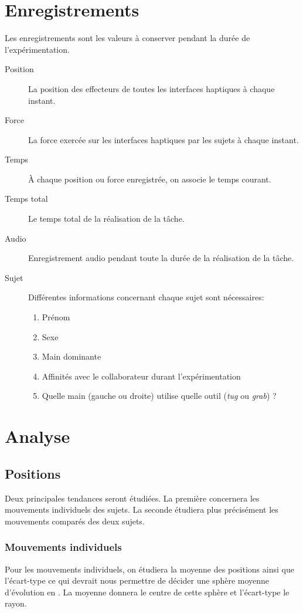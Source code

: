 \documentclass[a4paper,fleqn]{report}
\begin{document}
		\section{Enregistrements}
			Les enregistrements sont les valeurs à conserver pendant la durée de l'expérimentation.
			\begin{description}
				\item[Position] La position des effecteurs de toutes les interfaces haptiques à chaque instant.
				\item[Force] La force exercée sur les interfaces haptiques par les sujets à chaque instant.
				\item[Temps] À chaque position ou force enregistrée, on associe le temps courant.
				\item[Temps total] Le temps total de la réalisation de la tâche.
				\item[Audio] Enregistrement audio pendant toute la durée de la réalisation de la tâche.
				\item[Sujet] Différentes informations concernant chaque sujet sont nécessaires:
				\begin{enumerate}
					\item Prénom 
					\item Sexe
					\item Main dominante
					\item Affinités avec le collaborateur durant l'expérimentation
					\item Quelle main (gauche ou droite) utilise quelle outil (\emph{tug} ou \emph{grab}) ?
				\end{enumerate}
			\end{description}

		\section{Analyse}
			\subsection{Positions}
				Deux principales tendances seront étudiées.
				La première concernera les mouvements individuels des sujets.
				La seconde étudiera plus précisément les mouvements comparés des deux sujets.
				\subsubsection{Mouvements individuels}
					Pour les mouvements individuels, on étudiera la moyenne des positions ainsi que l'écart-type ce qui devrait nous permettre de décider une sphère moyenne d'évolution en .
					La moyenne donnera le centre de cette sphère et l'écart-type le rayon.
\end{document}
